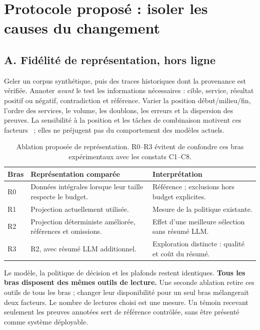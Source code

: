\documentclass[11pt,a4paper]{article}
\begin{document}
\section{Protocole proposé : isoler les causes du changement}
\label{sec:protocol}
\subsection{A. Fidélité de représentation, hors ligne}
Geler un corpus synthétique, puis des traces historiques dont la provenance est vérifiée. Annoter \emph{avant} le test les informations nécessaires : cible, service, résultat positif ou négatif, contradiction et référence. Varier la position début/milieu/fin, l'ordre des services, le volume, les doublons, les erreurs et la dispersion des preuves. La sensibilité à la position et les tâches de combinaison motivent ces facteurs~\cite{liu,ruler} ; elles ne préjugent pas du comportement des modèles actuels.

\begin{table}[htbp]
\centering\small
\noindent\begin{tabularx}{\linewidth}{@{}p{12mm}Yp{52mm}@{}}
\toprule
\textbf{Bras} & \textbf{Représentation comparée} & \textbf{Interprétation} \\
\midrule
R0 & Données intégrales lorsque leur taille respecte le budget. & Référence ; exclusions hors budget explicites. \\
R1 & Projection actuellement utilisée. & Mesure de la politique existante. \\
R2 & Projection déterministe améliorée, références et omissions. & Effet d'une meilleure sélection sans résumé LLM. \\
R3 & R2, avec résumé LLM additionnel. & Exploration distincte : qualité et coût du résumé. \\
\bottomrule
\end{tabularx}
\caption{Ablation proposée de représentation. R0--R3 évitent de confondre ces bras expérimentaux avec les constats C1--C8.}
\label{tab:ablation}
\end{table}

Le modèle, la politique de décision et les plafonds restent identiques. \textbf{Tous les bras disposent des mêmes outils de lecture.} Une seconde ablation retire ces outils de tous les bras ; changer leur disponibilité pour un seul bras mélangerait deux facteurs. Le nombre de lectures choisi est une mesure. Un témoin recevant seulement les preuves annotées sert de référence contrôlée, sans être présenté comme système déployable.
\end{document}

